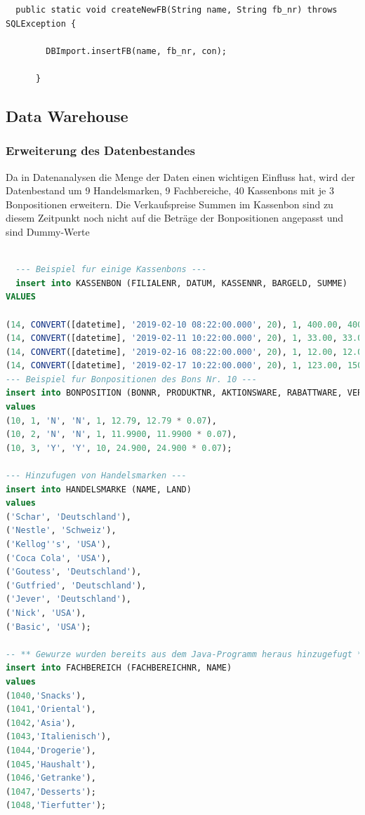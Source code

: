 \begin{lstlisting}
  public static void createNewFB(String name, String fb_nr) throws SQLException {

        DBImport.insertFB(name, fb_nr, con);

      }
\end{lstlisting}

\subsection{Data Warehouse}

\subsubsection{Erweiterung des Datenbestandes}
Da in Datenanalysen die Menge der Daten einen wichtigen Einfluss hat, wird der Datenbestand um 9 Handelsmarken, 9 Fachbereiche, 40 Kassenbons mit je 3 Bonpositionen erweitern. Die Verkaufspreise Summen im Kassenbon sind zu diesem Zeitpunkt noch nicht auf die Beträge der Bonpositionen angepasst und sind \glqq Dummy-Werte\grqq{}

\begin{lstlisting}[language=SQL]

  --- Beispiel fur einige Kassenbons ---
  insert into KASSENBON (FILIALENR, DATUM, KASSENNR, BARGELD, SUMME)
VALUES

(14, CONVERT([datetime], '2019-02-10 08:22:00.000', 20), 1, 400.00, 400.00),
(14, CONVERT([datetime], '2019-02-11 10:22:00.000', 20), 1, 33.00, 33.00),
(14, CONVERT([datetime], '2019-02-16 08:22:00.000', 20), 1, 12.00, 12.00),
(14, CONVERT([datetime], '2019-02-17 10:22:00.000', 20), 1, 123.00, 150.00),
--- Beispiel fur Bonpositionen des Bons Nr. 10 ---
insert into BONPOSITION (BONNR, PRODUKTNR, AKTIONSWARE, RABATTWARE, VERKAUFSMENGE, VERKAUFSPREIS, MWST)
values
(10, 1, 'N', 'N', 1, 12.79, 12.79 * 0.07),
(10, 2, 'N', 'N', 1, 11.9900, 11.9900 * 0.07),
(10, 3, 'Y', 'Y', 10, 24.900, 24.900 * 0.07);

--- Hinzufugen von Handelsmarken ---
insert into HANDELSMARKE (NAME, LAND)
values
('Schar', 'Deutschland'),
('Nestle', 'Schweiz'),
('Kellog''s', 'USA'),
('Coca Cola', 'USA'),
('Goutess', 'Deutschland'),
('Gutfried', 'Deutschland'),
('Jever', 'Deutschland'),
('Nick', 'USA'),
('Basic', 'USA');

-- ** Gewurze wurden bereits aus dem Java-Programm heraus hinzugefugt *** --
insert into FACHBEREICH (FACHBEREICHNR, NAME)
values
(1040,'Snacks'),
(1041,'Oriental'),
(1042,'Asia'),
(1043,'Italienisch'),
(1044,'Drogerie'),
(1045,'Haushalt'),
(1046,'Getranke'),
(1047,'Desserts');
(1048,'Tierfutter');

\end{lstlisting}
